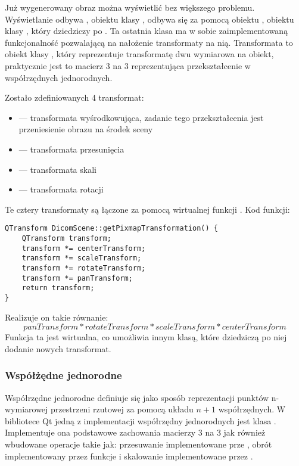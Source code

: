 \label{sec:sokar-dicomscene-tranformat}

\par
Już wygenerowany obraz można wyświetlić bez większego problemu.
Wyświetlanie odbywa , obiektu klasy , odbywa się za pomocą obiektu , obiektu klasy , który dziedziczy po .
Ta ostatnia klasa ma w sobie zaimplementowaną funkcjonalność pozwalającą na nałożenie transformaty na nią.
Transformata to obiekt klasy , który reprezentuje transformatę dwu wymiarowa na obiekt, praktycznie jest to macierz 3 na 3 reprezentująca przekształcenie w współrzędnych jednorodnych.
\par

Zostało zdefiniowanych 4 transformat:
\begin{itemize}
    \item {} --- transformata wyśrodkowująca, zadanie tego przekształcenia jest przeniesienie obrazu na środek sceny
    \item {} --- transformata przesunięcia
    \item {} --- transformata skali
    \item {} --- transformata rotacji
\end{itemize}

Te cztery transformaty są łączone za pomocą wirtualnej funkcji .
Kod funkcji:
\begin{lstlisting}
QTransform DicomScene::getPixmapTransformation() {
	QTransform transform;
	transform *= centerTransform;
	transform *= scaleTransform;
	transform *= rotateTransform;
	transform *= panTransform;
	return transform;
}
\end{lstlisting}
Realizuje on takie równanie:
\[panTransform*rotateTransform*scaleTransform*centerTransform\]
Funkcja ta jest wirtualna, co umożliwia innym klasą, które dziedziczą po niej dodanie nowych transformat.

\subsubsection{Współżędne jednorodne}

Współrzędne jednorodne definiuje się jako sposób reprezentacji punktów n-wymiarowej przestrzeni rzutowej za pomocą układu $n+1$ współrzędnych.
W bibliotece Qt jedną z implementacji współrzędny jednorodnych jest klasa .
Implementuje ona podstawowe zachowania macierzy 3 na 3 jak również wbudowane operacje takie jak: przesuwanie implementowane prze , obrót implementowany przez funkcje  i skalowanie implementowane przez .

